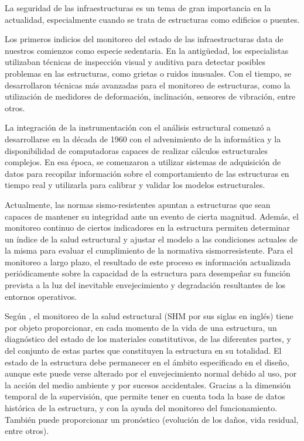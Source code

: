 La seguridad de las infraestructuras es un tema de gran importancia en la actualidad, especialmente cuando se trata de estructuras como edificios o puentes.

Los primeros indicios del monitoreo del estado de las infraestructuras data de nuestros comienzos como especie sedentaria.  En la antigüedad, los especialistas utilizaban técnicas de inspección visual y auditiva para detectar posibles problemas en las estructuras, como grietas o ruidos inusuales. Con el tiempo, se desarrollaron técnicas más avanzadas para el monitoreo de estructuras, como la utilización de medidores de deformación, inclinación, sensores de vibración, entre otros.

La integración de la instrumentación con el análisis estructural comenzó a desarrollarse en la década de 1960 con el advenimiento de la informática y la disponibilidad de computadoras capaces de realizar cálculos estructurales complejos. En esa época, se comenzaron a utilizar sistemas de adquisición de datos para recopilar información sobre el comportamiento de las estructuras en tiempo real y utilizarla para calibrar y validar los modelos estructurales.

Actualmente, las normas sismo-resistentes apuntan a estructuras que sean capaces de mantener su integridad ante un evento de cierta magnitud. Además, el monitoreo continuo de ciertos indicadores en la estructura permiten determinar un índice de la salud estructural y ajustar el modelo a las condiciones actuales de la misma para evaluar el cumplimiento de la normativa sismorresistente. Para el monitoreo a largo plazo, el resultado de este proceso es información actualizada periódicamente sobre la capacidad de la estructura para desempeñar su función prevista a la luz del inevitable envejecimiento y degradación resultantes de los entornos operativos.

Según \cite{balageas2010structural}, el monitoreo de la salud estructural (SHM por sus siglas en inglés) tiene por objeto proporcionar, en cada momento de la vida de una estructura, un diagnóstico del estado de los materiales constitutivos, de las diferentes
partes, y del conjunto de estas partes que constituyen la estructura en su totalidad. El estado de la estructura debe permanecer en el ámbito especificado en el diseño, aunque este puede verse alterado por el envejecimiento normal debido al uso, por la acción del medio ambiente y por sucesos accidentales. Gracias a la dimensión temporal de la supervisión, que permite tener en cuenta toda la base de datos histórica de la estructura, y con la ayuda del monitoreo del funcionamiento. También puede proporcionar un pronóstico (evolución de los daños, vida residual, entre otros).

